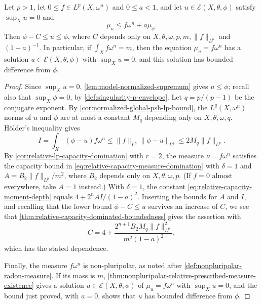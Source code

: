 \begin{corollary}\label{cor:relative-lp-capacity-boundedness}
Let $p>1$, let $0\leq f\in L^p(X,\omega^n)$ and $0\leq a<1$, and let $u\in\mathcal E(X,\theta,\phi)$ satisfy $\sup_Xu=0$ and
\[
 \mu_u\leq f\omega^n+a\mu_\phi.
\]
Then $\phi-C\leq u\leq\phi$, where $C$ depends only on $X,\theta,\omega,p,m,\|f\|_{L^p}$ and $(1-a)^{-1}$. In particular, if $\int_X f\omega^n=m$, then the equation $\mu_u=f\omega^n$ has a solution $u\in\mathcal E(X,\theta,\phi)$ with $\sup_Xu=0$, and this solution has bounded difference from $\phi$.
\end{corollary}
\begin{proof}
Since $\sup_Xu=0$, \cref{lem:model-normalized-supremum} gives $u\leq\phi$; recall also that $\sup_X\phi=0$, by \cref{def:singularity-p-envelope}. Let $q=p/(p-1)$ be the conjugate exponent. By \cref{cor:normalized-global-psh-lp-bound}, the $L^q(X,\omega^n)$ norms of $u$ and $\phi$ are at most a constant $M_q$ depending only on $X,\theta,\omega,q$. H\"older's inequality gives
\[
 I=\int_X(\phi-u)f\omega^n
       \leq\|f\|_{L^p}\|\phi-u\|_{L^q}
       \leq2M_q\|f\|_{L^p}.
\]
By \cref{cor:relative-lp-capacity-domination} with $r=2$, the measure $\nu=f\omega^n$ satisfies the capacity bound in \eqref{eq:relative-capacity-measure-domination} with $\delta=1$ and $A=B_2\|f\|_{L^p}/m^2$, where $B_2$ depends only on $X,\theta,\omega,p$. (If $f=0$ almost everywhere, take $A=1$ instead.) With $\delta=1$, the constant \eqref{eq:relative-capacity-moment-depth} equals $4+2^nAI/(1-a)^2$. Inserting the bounds for $A$ and $I$, and recalling that the lower bound $\phi-C\leq u$ survives an increase of $C$, we see that \cref{thm:relative-capacity-dominated-boundedness} gives the assertion with
\[
 C=4+\frac{2^{n+1}B_2M_q\|f\|_{L^p}^2}{m^2(1-a)^2},
\]
which has the stated dependence.

Finally, the measure $f\omega^n$ is non-pluripolar, as noted after \cref{def:nonpluripolar-radon-measure}. If its mass is $m$, \cref{thm:nonpluripolar-relative-prescribed-measure-existence} gives a solution $u\in\mathcal E(X,\theta,\phi)$ of $\mu_u=f\omega^n$ with $\sup_Xu=0$, and the bound just proved, with $a=0$, shows that $u$ has bounded difference from $\phi$.
\end{proof}
